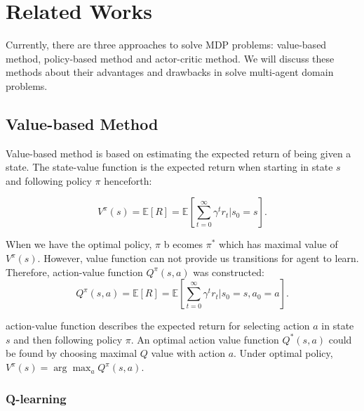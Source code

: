 \documentclass[11pt,twocolumn]{jarticle} %
\begin{document}
\section{Related Works}

Currently, there are three approaches to solve MDP problems: value-based method, policy-based method and actor-critic method. We will discuss these methods about their advantages and drawbacks in solve multi-agent domain problems.

\subsection{Value-based Method}

Value-based method is based on estimating the expected return of being given a state. The state-value function is the expected return when starting in state $s$ and following policy $\pi$ henceforth: 

\begin{equation}
V^\pi(s) = \mathbb{E}[R] = \mathbb{E}[\sum_{t=0}^{\infty}\gamma^t r_t | s_0 = s].
\end{equation}

When we have the optimal policy, $\pi$ b ecomes $\pi^*$ which has maximal value of $V^\pi(s)$. However, value function can not provide us transitions for agent to learn. Therefore, action-value function $Q^\pi(s, a)$ was constructed:
\begin{equation}
Q^\pi(s, a) = \mathbb{E}[R] = \mathbb{E}[\sum_{t=0}^{\infty}\gamma^t r_t | s_0 = s, a_0 = a]. 
\end{equation}

action-value function describes the expected return for selecting action $a$ in state $s$ and then following policy $\pi$. An optimal action value function $Q^*(s, a)$ could be found by choosing maximal $Q$ value with action $a$. Under optimal policy, $V^\pi(s) = \arg\max_a{Q^\pi(s, a)}$.

\subsubsection{Q-learning\cite{qlearning}}
\end{document}
